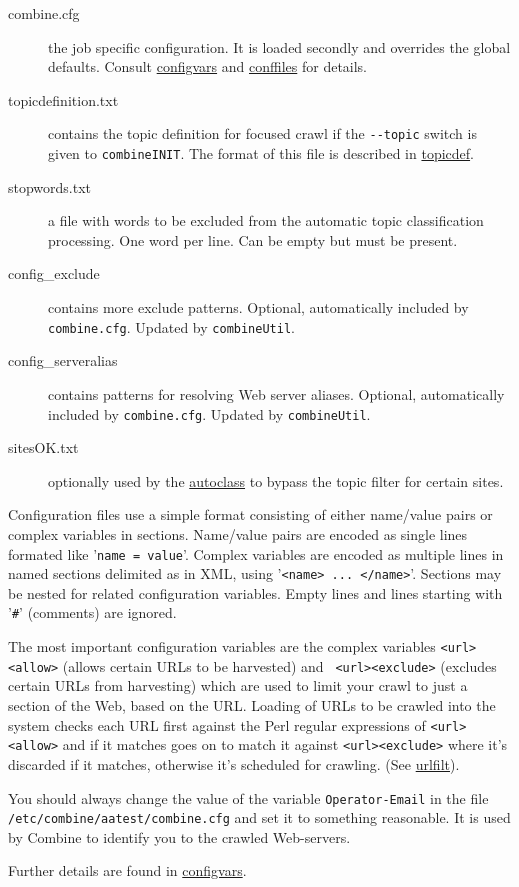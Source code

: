 \begin{description}
\begin{description}
\item[combine.cfg] the job specific configuration. It is loaded secondly
 and overrides the global defaults. Consult \hyperref{section 'Configuration Variables'}{section }{}{configvars}
and \hyperref{'Default configuration files'}{appendix }{}{conffiles} for details.

\item[topicdefinition.txt] contains the topic definition for
focused crawl if the \verb+--topic+ switch is given to {\tt combineINIT}.
The format of this file is described in \hyperref{'Topic definition'}{section }{}{topicdef}.

\item[stopwords.txt] a file with words to be excluded from the automatic topic
classification processing. One word per line. Can be empty but must be present.

\item[config\_exclude] contains more exclude patterns.
Optional, automatically included by {\tt combine.cfg}. Updated by {\tt combineUtil}.
\item[config\_serveralias] contains patterns for resolving Web server aliases.
Optional, automatically included by {\tt combine.cfg}. Updated by {\tt combineUtil}.
\item[sitesOK.txt] optionally used by the
 \hyperref{built in automated classification algorithms}{built in automated classification algorithms (section }{)}{autoclass} to bypass
the topic filter for certain sites.
\end{description}
\end{description}

Configuration files use a simple format consisting of either name/value pairs
or complex variables in sections. Name/value pairs are encoded as single lines 
formated like '{\tt name~=~value}'. Complex variables are encoded as multiple
lines in named sections delimited as in XML, using '{\tt <name> ... </name>}'.
Sections may be nested for related configuration variables.
Empty lines and lines starting with '{\tt \#}' (comments) are ignored.


The most important configuration variables are the complex variables
{\tt <url><allow>} (allows certain URLs to be harvested) and {\tt
<url><exclude>} (excludes certain URLs from harvesting) which are used
to limit your crawl to just a section of the Web, based on the URL.
Loading of URLs to be crawled into the system checks each URL first
against the Perl regular expressions of {\tt <url><allow>} and if it
matches goes on to match it against {\tt <url><exclude>} where it's
discarded if it matches, otherwise it's scheduled for crawling.
(See \hyperref{'URL filtering'}{section }{ 'URL filtering'}{urlfilt}).

You should always change the value of the variable {\tt Operator-Email} 
in the file\\
{\tt /etc/combine/aatest/combine.cfg} and set it to something
reasonable. It is used by Combine to identify you to the crawled Web-servers.

Further details are found in
\hyperref{'Configuration variables'}{section }{ 'Configuration variables'}{configvars}.
